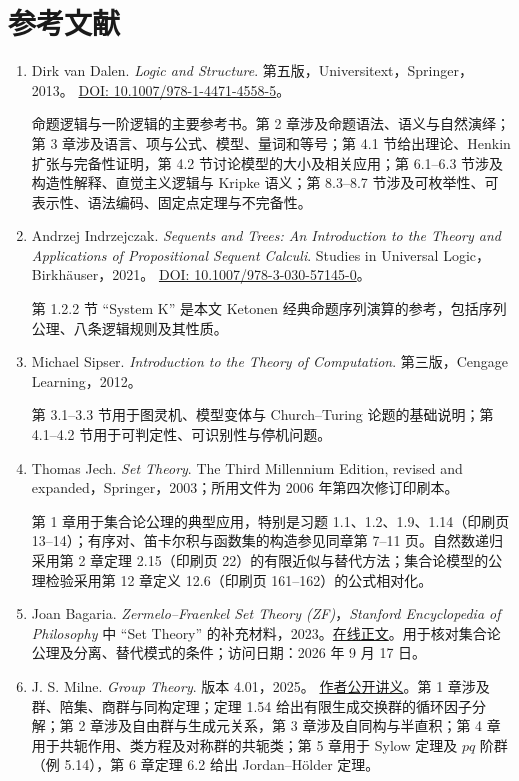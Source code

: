 \documentclass[lang=cn,a4paper,fontset=none,zihao=false,10pt,openany,twoside]{beautybook}
\numberwithin{algorithm}{chapter}
\begin{document}
\chapter{参考文献}
\begin{enumerate}[(1)]
\item Dirk van Dalen. \emph{Logic and Structure}. 第五版，Universitext，Springer，2013。
\href{https://doi.org/10.1007/978-1-4471-4558-5}{DOI: 10.1007/978-1-4471-4558-5}。

命题逻辑与一阶逻辑的主要参考书。第 2 章涉及命题语法、语义与自然演绎；第 3 章涉及语言、项与公式、模型、量词和等号；第 4.1 节给出理论、Henkin 扩张与完备性证明，第 4.2 节讨论模型的大小及相关应用；第 6.1--6.3 节涉及构造性解释、直觉主义逻辑与 Kripke 语义；第 8.3--8.7 节涉及可枚举性、可表示性、语法编码、固定点定理与不完备性。

\item Andrzej Indrzejczak. \emph{Sequents and Trees: An Introduction to the Theory and Applications of Propositional Sequent Calculi}. Studies in Universal Logic，Birkh\"auser，2021。
\href{https://doi.org/10.1007/978-3-030-57145-0}{DOI: 10.1007/978-3-030-57145-0}。

第 1.2.2 节 ``System K'' 是本文 Ketonen 经典命题序列演算的参考，包括序列公理、八条逻辑规则及其性质。

\item Michael Sipser. \emph{Introduction to the Theory of Computation}. 第三版，Cengage Learning，2012。

第 3.1--3.3 节用于图灵机、模型变体与 Church--Turing 论题的基础说明；第 4.1--4.2 节用于可判定性、可识别性与停机问题。

\item Thomas Jech. \emph{Set Theory}. The Third Millennium Edition, revised and expanded，Springer，2003；所用文件为 2006 年第四次修订印刷本。

第 1 章用于集合论公理的典型应用，特别是习题 1.1、1.2、1.9、1.14（印刷页 13--14）；有序对、笛卡尔积与函数集的构造参见同章第 7--11 页。自然数递归采用第 2 章定理 2.15（印刷页 22）的有限近似与替代方法；集合论模型的公理检验采用第 12 章定义 12.6（印刷页 161--162）的公式相对化。

\item Joan Bagaria. \emph{Zermelo--Fraenkel Set Theory (ZF)}，\emph{Stanford Encyclopedia of Philosophy} 中 ``Set Theory'' 的补充材料，2023。\href{https://plato.stanford.edu/entries/set-theory/ZF.html}{在线正文}。用于核对集合论公理及分离、替代模式的条件；访问日期：2026 年 9 月 17 日。
\item J. S. Milne. \emph{Group Theory}. 版本 4.01，2025。
\href{https://www.jmilne.org/math/CourseNotes/GT.pdf}{作者公开讲义}。第 1 章涉及群、陪集、商群与同构定理；定理 1.54 给出有限生成交换群的循环因子分解；第 2 章涉及自由群与生成元关系，第 3 章涉及自同构与半直积；第 4 章用于共轭作用、类方程及对称群的共轭类；第 5 章用于 Sylow 定理及 $pq$ 阶群（例 5.14），第 6 章定理 6.2 给出 Jordan--Hölder 定理。


\end{enumerate}
\end{document}
